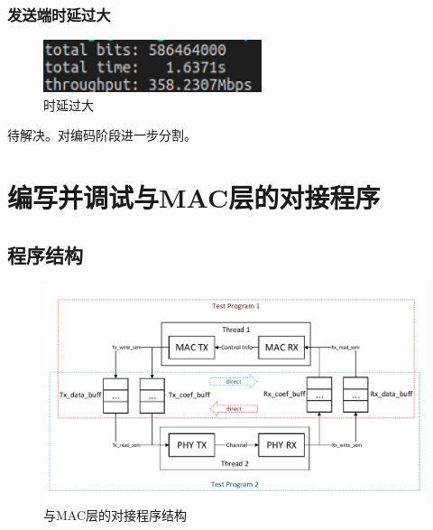 \documentclass{article}
\begin{document}
\subsubsection{发送端时延过大}
\begin{figure}[H]
	\centering
	\includegraphics[width = .4\textwidth]{res.png}
	\caption{时延过大}
\end{figure}
待解决。对编码阶段进一步分割。

\section{编写并调试与MAC层的对接程序}
\subsection{程序结构}
\begin{figure}[H]
	\centering
	\includegraphics[width = \textwidth]{structure.pdf}
	\caption{与MAC层的对接程序结构}
\end{figure}
\end{document}
